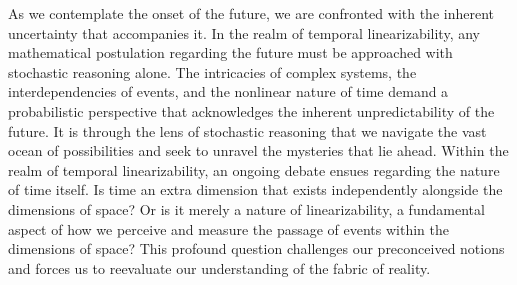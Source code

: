 \documentclass[ebook,12pt,oneside,openany]{memoir}
\begin{document}
As we contemplate the onset of the future, we are confronted with the inherent uncertainty that accompanies it. In the realm of temporal linearizability, any mathematical postulation regarding the future must be approached with stochastic reasoning alone. The intricacies of complex systems, the interdependencies of events, and the nonlinear nature of time demand a probabilistic perspective that acknowledges the inherent unpredictability of the future. It is through the lens of stochastic reasoning that we navigate the vast ocean of possibilities and seek to unravel the mysteries that lie ahead.
Within the realm of temporal linearizability, an ongoing debate ensues regarding the nature of time itself. Is time an extra dimension that exists independently alongside the dimensions of space? Or is it merely a nature of linearizability, a fundamental aspect of how we perceive and measure the passage of events within the dimensions of space? This profound question challenges our preconceived notions and forces us to reevaluate our understanding of the fabric of reality.
\end{document}
